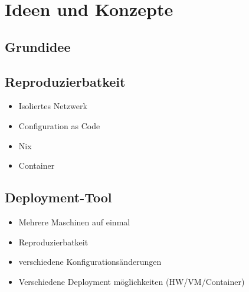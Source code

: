 \chapter{Ideen und Konzepte}
\section{Grundidee}



\section{Reproduzierbatkeit}

\begin{itemize}
    \item Isoliertes Netzwerk
    \item Configuration as Code
    \item Nix
    \item Container
\end{itemize}

\section{Deployment-Tool}

\begin{itemize}
    \item Mehrere Maschinen auf einmal
    \item Reproduzierbatkeit
    \item verschiedene Konfigurationsänderungen
    \item Verschiedene Deployment möglichkeiten (HW/VM/Container)
\end{itemize}

